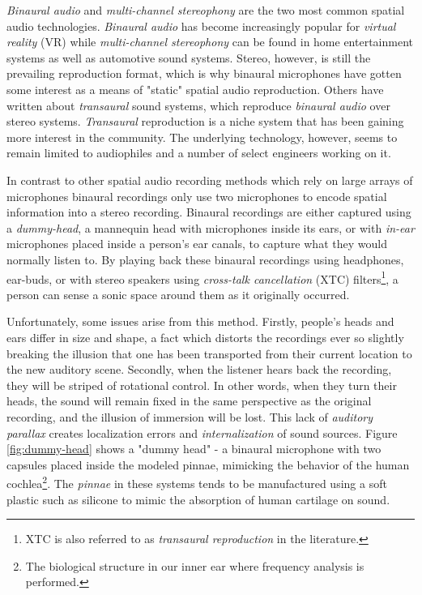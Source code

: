 \textit{Binaural audio} and \textit{multi-channel stereophony} are the two most common spatial audio technologies. \textit{Binaural audio} has become increasingly popular for \textit{virtual reality} (VR) while \textit{multi-channel stereophony} can be found in home entertainment systems as well as automotive sound systems. Stereo, however, is still the prevailing reproduction format, which is why binaural microphones have gotten some interest as a means of "static" spatial audio reproduction. Others have written about \textit{transaural} sound systems, which reproduce \textit{binaural audio} over stereo systems. \textit{Transaural} reproduction is a niche system that has been gaining more interest in the community. The underlying technology, however, seems to remain limited to audiophiles and a number of select engineers working on it.

In contrast to other spatial audio recording methods which rely on large arrays of microphones binaural recordings only use two microphones to encode spatial information into a stereo recording. Binaural recordings are either captured using a \textit{dummy-head}, a mannequin head with microphones inside its ears, or with \textit{in-ear} microphones placed inside a person's ear canals, to capture what they would normally listen to. By playing back these binaural recordings using headphones, ear-buds, or with stereo speakers using \textit{cross-talk cancellation} (XTC) filters\footnote{XTC is also referred to as \textit{transaural reproduction} in the literature.}, a person can sense a sonic space around them as it originally occurred. 

Unfortunately, some issues arise from this method. Firstly, people's heads and ears differ in size and shape, a fact which distorts the recordings ever so slightly breaking the illusion that one has been transported from their current location to the new auditory scene. Secondly, when the listener hears back the recording, they will be striped of rotational control. In other words, when they turn their heads, the sound will remain fixed in the same perspective as the original recording, and the illusion of immersion will be lost. This lack of \textit{auditory parallax} creates localization errors and \textit{internalization} of sound sources. Figure \ref{fig:dummy-head} shows a "dummy head" - a binaural microphone with two capsules placed inside the modeled pinnae, mimicking the behavior of the human cochlea\footnote{The biological structure in our inner ear where frequency analysis is performed.}. The \textit{pinnae} in these systems tends to be manufactured using a soft plastic such as silicone to mimic the absorption of human cartilage on sound.

